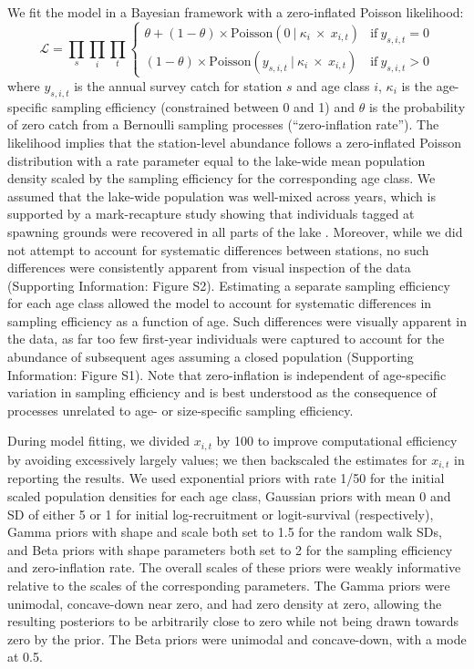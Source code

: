 \documentclass[11pt]{article}
\begin{document}
We fit the model in a Bayesian framework with a zero-inflated Poisson likelihood:
%
\begin{equation} \label{eq:likelihood}
\mathcal{L} = 
\displaystyle\prod_{s}
\displaystyle\prod_{i}
\displaystyle\prod_{t}
\begin{cases} 
      \theta + (1-\theta) \times \text{Poisson}
        \left(
            0~|~\kappa_i~\times~x_{i,t}
        \right) & \text{if}~y_{s,i,t} = 0 \\
      (1-\theta) \times \text{Poisson}
        \left(
            y_{s,i,t}~|~\kappa_i~\times~x_{i,t}
        \right) & \text{if}~y_{s,i,t} > 0
   \end{cases}
\end{equation}
%
where $y_{s,i,t}$ is the annual survey catch for station $s$ and age class $i$,
$\kappa_i$ is the age-specific sampling efficiency (constrained between 0 and 1)
and $\theta$ is the probability of zero catch from a Bernoulli sampling processes
(``zero-inflation rate'').
The likelihood implies that the station-level abundance follows a zero-inflated 
Poisson distribution with a rate parameter equal to the lake-wide mean population density 
scaled by the sampling efficiency for the corresponding age class.
We assumed that the lake-wide population was well-mixed across years,
which is supported by a mark-recapture study showing that individuals tagged
at spawning grounds were recovered in all parts of the lake \citep{gudbergsson1991}.
Moreover, while we did not attempt to account for systematic differences between stations,
no such differences were consistently apparent from visual inspection of the data 
(Supporting Information: Figure S2).
Estimating a separate sampling efficiency for each age class allowed the model to account
for systematic differences in sampling efficiency as a function of age.
Such differences were visually apparent in the data, 
as far too few first-year individuals were captured 
to account for the abundance of subsequent ages assuming a closed population
(Supporting Information: Figure S1). 
Note that zero-inflation is independent of age-specific variation in sampling efficiency
and is best understood as the consequence of processes unrelated 
to age- or size-specific sampling efficiency.

During model fitting, we divided $x_{i,t}$ by 100 
to improve computational efficiency by avoiding excessively largely values;
we then backscaled the estimates for $x_{i,t}$ in reporting the results.
We used exponential priors with rate 1/50 for the initial scaled population densities for
each age class, 
Gaussian priors with mean 0 and SD of either 5 or 1 for 
initial log-recruitment or logit-survival (respectively), 
Gamma priors with shape and scale both set to 1.5 for the random walk SDs,
and Beta priors with shape parameters both set to 2 for the sampling efficiency
and zero-inflation rate.
The overall scales of these priors were weakly informative relative to the 
scales of the corresponding parameters.
The Gamma priors were unimodal, concave-down near zero, and had zero density at zero,
allowing the resulting posteriors to be arbitrarily close to zero 
while not being drawn towards zero by the prior.
The Beta priors were unimodal and concave-down, with a mode at 0.5.
\end{document}

